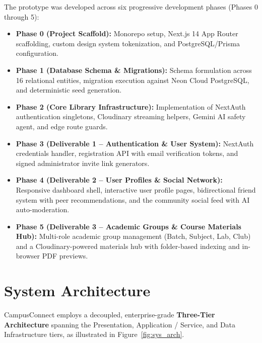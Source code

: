 \documentclass[12pt, a4paper, oneside]{report}
\begin{document}
The prototype was developed across six progressive development phases (Phases 0 through 5):
\begin{itemize}[leftmargin=0.7cm]
    \item \textbf{Phase 0 (Project Scaffold):} Monorepo setup, Next.js 14 App Router scaffolding, custom design system tokenization, and PostgreSQL/Prisma configuration.
    \item \textbf{Phase 1 (Database Schema \& Migrations):} Schema formulation across 16 relational entities, migration execution against Neon Cloud PostgreSQL, and deterministic seed generation.
    \item \textbf{Phase 2 (Core Library Infrastructure):} Implementation of NextAuth authentication singletons, Cloudinary streaming helpers, Gemini AI safety agent, and edge route guards.
    \item \textbf{Phase 3 (Deliverable 1 -- Authentication \& User System):} NextAuth credentials handler, registration API with email verification tokens, and signed administrator invite link generators.
    \item \textbf{Phase 4 (Deliverable 2 -- User Profiles \& Social Network):} Responsive dashboard shell, interactive user profile pages, bidirectional friend system with peer recommendations, and the community social feed with AI auto-moderation.
    \item \textbf{Phase 5 (Deliverable 3 -- Academic Groups \& Course Materials Hub):} Multi-role academic group management (Batch, Subject, Lab, Club) and a Cloudinary-powered materials hub with folder-based indexing and in-browser PDF previews.
\end{itemize}

\section{System Architecture}
CampusConnect employs a decoupled, enterprise-grade \textbf{Three-Tier Architecture} spanning the Presentation, Application / Service, and Data Infrastructure tiers, as illustrated in Figure~\ref{fig:sys_arch}.
\end{document}
